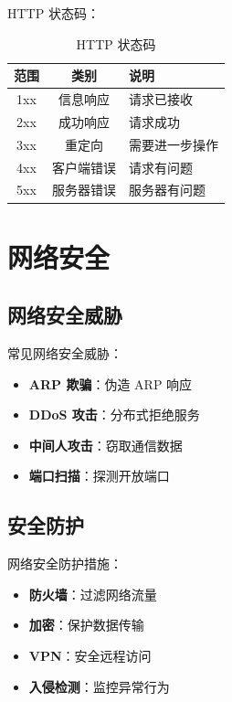 \documentclass[12pt,UTF8]{ctexbook}
\begin{document}
HTTP 状态码：
\begin{table}[htbp]
    \centering
    \caption{HTTP 状态码}
    \begin{tabular}{|c|c|p{5cm}|}
        \hline
        \textbf{范围} & \textbf{类别} & \textbf{说明} \\
        \hline
        1xx & 信息响应 & 请求已接收 \\
        \hline
        2xx & 成功响应 & 请求成功 \\
        \hline
        3xx & 重定向 & 需要进一步操作 \\
        \hline
        4xx & 客户端错误 & 请求有问题 \\
        \hline
        5xx & 服务器错误 & 服务器有问题 \\
        \hline
    \end{tabular}
\end{table}

\chapter{网络安全}
\label{chap:network_security}

\section{网络安全威胁}
\label{sec:security_threats}

常见网络安全威胁：
\begin{itemize}
    \item \textbf{ARP 欺骗}：伪造 ARP 响应
    \item \textbf{DDoS 攻击}：分布式拒绝服务
    \item \textbf{中间人攻击}：窃取通信数据
    \item \textbf{端口扫描}：探测开放端口
\end{itemize}

\section{安全防护}
\label{sec:security_protection}

网络安全防护措施：
\begin{itemize}
    \item \textbf{防火墙}：过滤网络流量
    \item \textbf{加密}：保护数据传输
    \item \textbf{VPN}：安全远程访问
    \item \textbf{入侵检测}：监控异常行为
\end{itemize}
\end{document}
